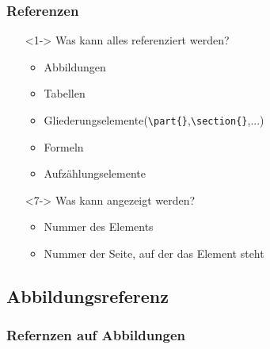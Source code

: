\documentclass{beamer}
\begin{document}
\begin{frame}[fragile]
\frametitle{Referenzen}
  \begin{itemize}
    \item[]<1-> Was kann alles referenziert werden?
    \begin{itemize}
      \item<2-> Abbildungen
      \item<3-> Tabellen
      \item<4-> Gliederungselemente(\verb+\part{}+,\verb+\section{}+,...)
      \item<5-> Formeln
      \item<6-> Aufzählungselemente
    \end{itemize}
    \item[]
    \item[]<7-> Was kann angezeigt werden?
    \begin{itemize}
      \item<8-> Nummer des Elements
      \item<9-> Nummer der Seite, auf der das Element steht 
    \end{itemize}
  \end{itemize}
\end{frame}

\subsection{Abbildungsreferenz}
\begin{frame}[fragile]
\frametitle{Refernzen auf Abbildungen}
  \begin{semiverbatim}
  \end{semiverbatim}
\end{frame}
\end{document}
